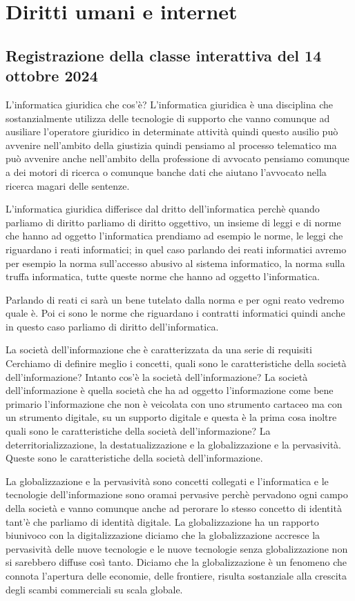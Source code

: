\chapter{Diritti umani e internet}
\section{Registrazione della classe interattiva del 14 ottobre 2024}


L'informatica giuridica che cos'è?
L'informatica giuridica è una disciplina che sostanzialmente utilizza delle tecnologie di supporto che vanno comunque ad ausiliare l'operatore giuridico in determinate attività quindi questo ausilio può avvenire nell'ambito della giustizia quindi pensiamo al processo telematico ma può avvenire anche nell'ambito della professione di avvocato pensiamo comunque a dei motori di ricerca o comunque banche dati che aiutano l'avvocato nella ricerca magari delle sentenze.

L'informatica giuridica differisce dal dritto dell'informatica perchè quando parliamo di diritto parliamo di diritto oggettivo, un insieme di leggi e di norme che hanno ad oggetto l'informatica prendiamo ad esempio le norme,  le leggi che riguardano i reati informatici; in quel caso  parlando dei reati informatici avremo per esempio la norma sull'accesso abusivo al sistema informatico, la norma sulla truffa informatica, tutte queste norme che hanno ad oggetto l'informatica. 

Parlando di reati ci sarà un bene tutelato dalla norma e per ogni reato vedremo quale è. Poi ci sono le norme che riguardano i contratti informatici quindi anche in questo caso parliamo di diritto dell'informatica.

La società dell'informazione che è caratterizzata da una serie di requisiti 
Cerchiamo di definire meglio i concetti, quali sono le caratteristiche della società dell'informazione?
Intanto cos'è la società dell'informazione?
La società dell'informazione è quella società che ha ad oggetto l'informazione come bene primario l'informazione che non è veicolata con uno strumento cartaceo ma con un strumento digitale, su un supporto digitale e questa è la prima cosa inoltre quali sono le caratteristiche della società dell'informazione?
La deterritorializzazione, la destatualizzazione e la globalizzazione e la pervasività. Queste sono le caratteristiche della società dell'informazione.

La globalizzazione e la pervasività sono concetti collegati e l'informatica e le tecnologie dell'informazione sono oramai pervasive perchè pervadono ogni campo della società e vanno comunque anche ad perorare lo stesso concetto di identità tant'è che parliamo di identità digitale.
La globalizzazione ha un rapporto biunivoco  con la digitalizzazione diciamo che la globalizzazione accresce la pervasività delle nuove tecnologie e le nuove tecnologie senza globalizzazione non si sarebbero diffuse così tanto.
Diciamo che la globalizzazione è un fenomeno che connota l'apertura delle economie, delle frontiere, risulta sostanziale alla crescita degli scambi commerciali su scala globale.

